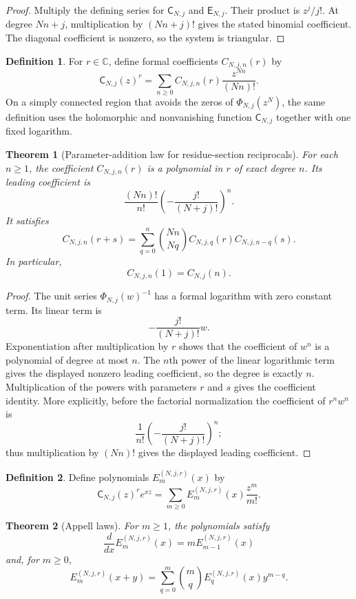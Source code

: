 \documentclass[11pt]{article}
\newtheorem{theorem}{Theorem}[section]
\theoremstyle{definition}
\newtheorem{definition}[definition]{Definition}
\theoremstyle{remark}
\newcommand{\CC}{\mathbb C}
\newcommand{\Efun}{\mathsf E}
\newcommand{\Cfun}{\mathsf C}
\begin{document}
\begin{proof}
Multiply the defining series for $\Cfun_{N,j}$ and $\Efun_{N,j}$.  Their product is $z^j/j!$.  At degree $Nn+j$, multiplication by $(Nn+j)!$ gives the stated binomial coefficient.  The diagonal coefficient is nonzero, so the system is triangular.
\end{proof}

\begin{definition}\label{def:residue_section_power}
For $r\in\CC$, define formal coefficients $C_{N,j,n}(r)$ by
\[
\Cfun_{N,j}(z)^r
=
\sum_{n\geq0}C_{N,j,n}(r)\frac{z^{Nn}}{(Nn)!}.
\]
On a simply connected region that avoids the zeros of $\Phi_{N,j}(z^N)$, the same definition uses the holomorphic and nonvanishing function $\Cfun_{N,j}$ together with one fixed logarithm.
\end{definition}

\begin{theorem}[Parameter-addition law for residue-section reciprocals]\label{thm:residue_section_parameter_addition}
For each $n\geq1$, the coefficient $C_{N,j,n}(r)$ is a polynomial in $r$ of exact degree $n$.  Its leading coefficient is
\[
\frac{(Nn)!}{n!}
\left(-\frac{j!}{(N+j)!}\right)^n.
\]
It satisfies
\[
C_{N,j,n}(r+s)
=
\sum_{q=0}^{n}
\binom{Nn}{Nq}
C_{N,j,q}(r)C_{N,j,n-q}(s).
\]
In particular,
\[
C_{N,j,n}(1)=C_{N,j}(n).
\]
\end{theorem}

\begin{proof}
The unit series $\Phi_{N,j}(w)^{-1}$ has a formal logarithm with zero constant term.  Its linear term is
\[
-\frac{j!}{(N+j)!}w.
\]
Exponentiation after multiplication by $r$ shows that the coefficient of $w^n$ is a polynomial of degree at most $n$.  The $n$th power of the linear logarithmic term gives the displayed nonzero leading coefficient, so the degree is exactly $n$.  Multiplication of the powers with parameters $r$ and $s$ gives the coefficient identity.
More explicitly, before the factorial normalization the coefficient of
$r^nw^n$ is
\[
\frac1{n!}\left(-\frac{j!}{(N+j)!}\right)^n;
\]
thus multiplication by $(Nn)!$ gives the displayed leading coefficient.
\end{proof}

\begin{definition}\label{def:block_appell}
Define polynomials $E_m^{(N,j,r)}(x)$ by
\[
\Cfun_{N,j}(z)^re^{xz}
=
\sum_{m\geq0}E_m^{(N,j,r)}(x)\frac{z^m}{m!}.
\]
\end{definition}

\begin{theorem}[Appell laws]\label{thm:appell_laws}
For $m\geq1$, the polynomials satisfy
\[
\frac{d}{dx}E_m^{(N,j,r)}(x)
=
mE_{m-1}^{(N,j,r)}(x)
\]
and, for $m\geq0$,
\[
E_m^{(N,j,r)}(x+y)
=
\sum_{q=0}^{m}
\binom mq
E_q^{(N,j,r)}(x)y^{m-q}.
\]
\end{theorem}
\end{document}
